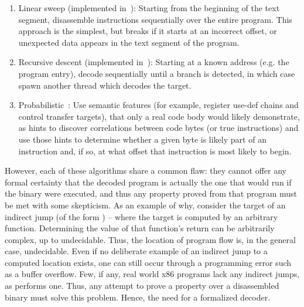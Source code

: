 \begin{enumerate}
    \item Linear sweep (implemented in~\cite{OBJDUMP}): Starting from the beginning of the text segment, disassemble instructions sequentially over the entire program.  This approach is the simplest, but breaks if it starts at an incorrect offset, or unexpected data appears in the text segment of the program.
    \item Recursive descent (implemented in~\cite{BAP:CAV11,IDA}): Starting at a known address (e.g. the program entry), decode sequentially until a branch is detected, in which case spawn another thread which decodes the target.
    \item Probabilistic~\cite{Miller:2019}: Use semantic features (for example, register use-def chains and control transfer targets), that only a real code body would likely demonstrate, as hints to discover correlations between code bytes (or true instructions) and use those hints to determine  
    whether a given byte is likely part of an instruction and, if so, at what offset that instruction is most likely to begin.
\end{enumerate}

However, each of these algorithms share a common flaw: they cannot offer any formal certainty that the decoded program is actually the one that would run if the binary were executed, and thus any property proved from that program must be met with some skepticism.  As an example of why, consider the target of an indirect jump (of the form ) – where the target is computed by an arbitrary function.  Determining the value of that function’s return can be arbitrarily complex, up to undecidable.  Thus, the location of program flow is, in the general case, undecidable.  Even if no deliberate example of an indirect jump to a computed location exists, one can still occur through a programming error such as a buffer overflow.  Few, if any, real world x86 programs lack any indirect jumps, as  performs one.  Thus, any attempt to prove a property over a disassembled binary must solve this problem.  Hence, the need for a formalized decoder.

